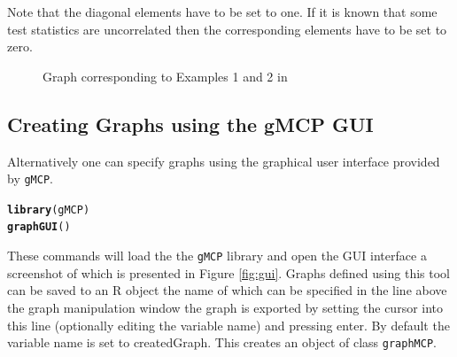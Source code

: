 \documentclass[a4paper, 11pt]{article}\usepackage[]{graphicx}\usepackage[]{color}
\makeatletter
\newcommand{\hlstd}[1]{\textcolor[rgb]{0.345,0.345,0.345}{#1}}%
\newcommand{\hlkwd}[1]{\textcolor[rgb]{0.737,0.353,0.396}{\textbf{#1}}}%
\newenvironment{kframe}{%
 \def\at@end@of@kframe{}%
 \ifinner\ifhmode%
  \def\at@end@of@kframe{\end{minipage}}%
  \begin{minipage}{\columnwidth}%
 \fi\fi%
 \def\FrameCommand##1{\hskip\@totalleftmargin \hskip-\fboxsep
 \colorbox{shadecolor}{##1}\hskip-\fboxsep
     \hskip-\linewidth \hskip-\@totalleftmargin \hskip\columnwidth}%
 \MakeFramed {\advance\hsize-\width
   \@totalleftmargin\z@ \linewidth\hsize
   \@setminipage}}%
 {\par\unskip\endMakeFramed%
 \at@end@of@kframe}
\newenvironment{knitrout}{}{} %
\newcommand{\gmcp}{\texttt{gMCP}\xspace}
\makeatother
\begin{document}
Note that the diagonal elements have to be set to one. If it is known
that some test statistics are uncorrelated then the corresponding
elements have to be set to zero.


\begin{figure}\centering
{}
  \caption{Graph corresponding to Examples 1 and 2 in \cite{Bretz11}}
\label{fig:bretz}
\end{figure}

\subsection{Creating Graphs using the gMCP GUI}
\label{sec:gMCPgui}

Alternatively one can specify graphs using the graphical user
interface provided by \gmcp.

\begin{knitrout}
\color{fgcolor}\begin{kframe}
\begin{alltt}
\hlkwd{library}\hlstd{(gMCP)}
\hlkwd{graphGUI}\hlstd{()}
\end{alltt}
\end{kframe}
\end{knitrout}


These commands will load the the \gmcp library and open the GUI
interface a screenshot of which is presented in Figure
\ref{fig:gui}. Graphs defined using this tool can be saved to an R
object the name of which can be specified in the line above the graph
manipulation window the graph is exported by setting the cursor into
this line (optionally editing the variable name) and pressing
enter. By default the variable name is set to createdGraph. This
creates an object of class \texttt{graphMCP}.
\end{document}
